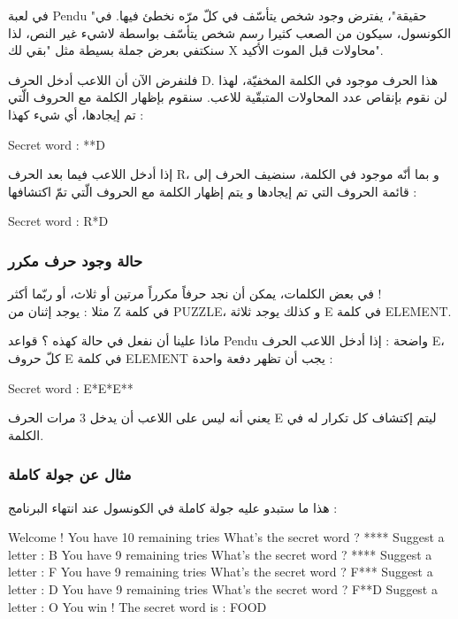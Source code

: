 \begin{information}
في لعبة
\textenglish{Pendu}
"حقيقة"، يفترض وجود شخص يتأسّف في كلّ مرّه نخطئ فيها. في الكونسول، سيكون من الصعب كثيرا رسم شخص يتأسّف بواسطة لاشيء غير النص،  لذا سنكتفي بعرض جملة بسيطة مثل "بقي لك
\textenglish{X}
محاولات قبل الموت الأكيد".
\end{information}

فلنفرض الآن أن اللاعب أدخل الحرف
\textenglish{D}.
هذا الحرف موجود في الكلمة المخفيّة، لهذا لن نقوم بإنقاص عدد المحاولات المتبقّية للاعب. سنقوم بإظهار الكلمة مع الحروف الّتي تم إيجادها، أي شيء كهذا :

\begin{Console}
Secret word : **D
\end{Console}

إذا أدخل اللاعب فيما بعد الحرف
\textenglish{R}،
و بما أنّه موجود في الكلمة، سنضيف الحرف إلى قائمة الحروف التي تم إيجادها و يتم إظهار الكلمة مع الحروف الّتي تمّ اكتشافها :

\begin{Console}
Secret word : R*D
\end{Console}

\subsubsection{حالة وجود حرف مكرر}

في بعض الكلمات، يمكن أن نجد حرفاً مكرراً مرتين أو ثلاث، أو ربّما أكثر !\\
مثلا : يوجد إثنان من
\textenglish{Z}
في كلمة
\textenglish{PUZZLE}،
و كذلك يوجد ثلاثة
\textenglish{E}
في كلمة
\textenglish{ELEMENT}.

ماذا علينا أن نفعل في حالة كهذه ؟ قواعد
\textenglish{Pendu}
واضحة : إذا أدخل اللاعب الحرف
\textenglish{E}،
كلّ حروف
\textenglish{E}
في كلمة
\textenglish{ELEMENT}
يجب أن تظهر دفعة واحدة :

\begin{Console}
Secret word : E*E*E**
\end{Console}

يعني أنه ليس على اللاعب أن يدخل 3 مرات الحرف
\textenglish{E}
ليتم إكتشاف كل تكرار له في الكلمة.

\subsubsection{مثال عن جولة كاملة}

هذا ما ستبدو عليه جولة كاملة في الكونسول عند انتهاء البرنامج :

\begin{Console}
Welcome !
You have 10 remaining tries
What's the secret word ? ****
Suggest a letter : B
You have 9 remaining tries
What's the secret word ? ****
Suggest a letter : F
You have 9 remaining tries
What's the secret word ? F***
Suggest a letter : D
You have 9 remaining tries
What's the secret word ? F**D
Suggest a letter : O
You win ! The secret word is  : FOOD
\end{Console}

